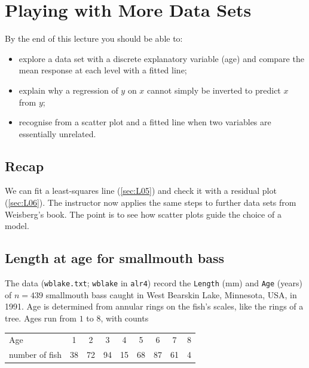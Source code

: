 \section{Playing with More Data Sets}\label{sec:L07}


\begin{guiding*}
By the end of this lecture you should be able to:
\begin{itemize}
  \item explore a data set with a discrete explanatory variable (age) and compare the mean response at each level with a fitted line;
  \item explain why a regression of $y$ on $x$ cannot simply be inverted to predict $x$ from $y$;
  \item recognise from a scatter plot and a fitted line when two variables are essentially unrelated.
\end{itemize}
\end{guiding*}

\subsection{Recap}
We can fit a least-squares line (\cref{sec:L05}) and check it with a residual plot
(\cref{sec:L06}). The instructor now applies the same steps to further data sets from
Weisberg's book. The point is to see how scatter plots guide the choice of a model.

\subsection{Length at age for smallmouth bass}
\begin{example}\label{ex:L07-bass}
The data (\texttt{wblake.txt}; \texttt{wblake} in \texttt{alr4}) record the \texttt{Length}
(mm) and \texttt{Age} (years) of $n=439$ smallmouth bass caught in West Bearskin Lake, Minnesota,
USA, in 1991. Age is determined from annular rings on the fish's scales, like the rings of a
tree. Ages run from $1$ to $8$, with counts
\begin{center}
\begin{tabular}{lcccccccc}\hline
Age & 1 & 2 & 3 & 4 & 5 & 6 & 7 & 8\\
number of fish & 38 & 72 & 94 & 15 & 68 & 87 & 61 & 4\\\hline
\end{tabular}
\end{center}
\end{example}

